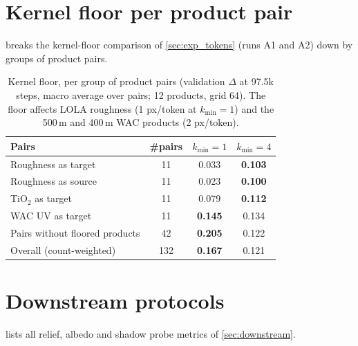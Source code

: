 \section{Kernel floor per product pair}
\label{sec:supp_floor}

 breaks the kernel-floor comparison of \cref{sec:exp_tokens} (runs A1 and A2) down by groups of product pairs.

\begin{table}[t]
  \centering
  \footnotesize
  \setlength{\tabcolsep}{3.5pt}
  \caption{Kernel floor, per group of product pairs (validation $\Delta$ at 97.5k steps, macro average over pairs; 12 products, grid 64). The floor affects LOLA roughness (1 px/token at $k_{\min}{=}1$) and the 500\,m and 400\,m WAC products (2 px/token).}
  \label{tab:floor}
  \begin{tabular}{@{}lccc@{}}
    \toprule
    Pairs & \#pairs & $k_{\min}{=}1$ & $k_{\min}{=}4$ \\
    \midrule
    Roughness as target                & 11 & 0.033 & \textbf{0.103} \\
    Roughness as source                & 11 & 0.023 & \textbf{0.100} \\
    TiO$_2$ as target                       & 11 & 0.079 & \textbf{0.112} \\
    WAC UV as target                        & 11 & \textbf{0.145} & 0.134 \\
    Pairs without floored products     & 42 & \textbf{0.205} & 0.122 \\
    \midrule
    Overall (count-weighted)                & 132 & \textbf{0.167} & 0.121 \\
    \bottomrule
  \end{tabular}
\end{table}

\section{Downstream protocols}
\label{sec:supp_downstream}

 lists all relief, albedo and shadow probe metrics of \cref{sec:downstream}.

